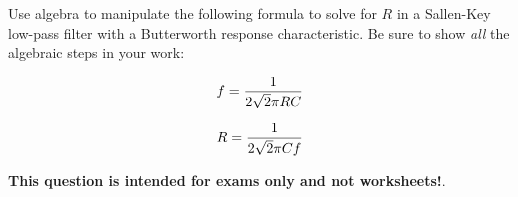 

Use algebra to manipulate the following formula to solve for $R$ in a Sallen-Key low-pass filter with a Butterworth response characteristic.  Be sure to show {\it all} the algebraic steps in your work:

$$f = {1 \over {2 \sqrt{2} \pi R C}}$$







$$R = {1 \over {2 \sqrt{2} \pi C f}}$$







{\bf This question is intended for exams only and not worksheets!}.



